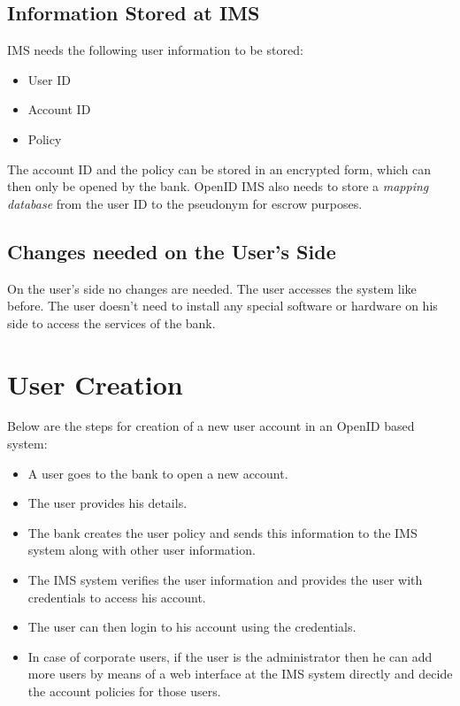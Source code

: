 \subsection{Information Stored at IMS}
IMS needs the following user information to be stored:
\begin{itemize}
	\item User ID
	\item Account ID
	\item Policy
\end{itemize}
The account ID and the policy can be stored in an encrypted form, which can then only be opened by the bank. OpenID IMS also needs to store a \textit{mapping database} from the user ID to the pseudonym for escrow purposes.
\subsection{Changes needed on the User's Side}
On the user's side no changes are needed. The user accesses the system like before. The user doesn't need to install any special software or hardware on his side to access the services of the bank. 
\section{User Creation}
Below are the steps for creation of a new user account in an OpenID based system:
\begin{itemize}
	\item A user goes to the bank to open a new account.
	\item The user provides his details.
	\item The bank creates the user policy and sends this information to the IMS system along with other user information.
	\item The IMS system verifies the user information and provides the user with credentials to access his account.
	\item The user can then login to his account using the credentials.
	\item In case of corporate users, if the user is the administrator then he can add more users by means of a web interface at the IMS system directly and decide the account policies for those users.
\end{itemize}
